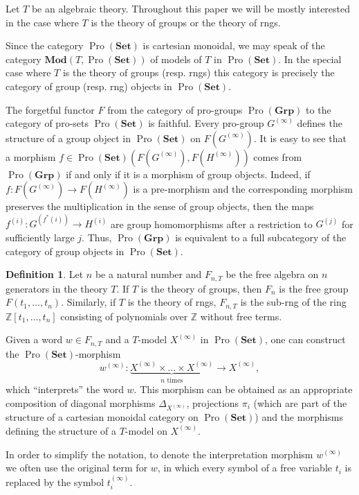 \documentclass[oneside, 11pt]{amsart}
\numberwithin{equation}{section}
\theoremstyle{definition}
\newtheorem{df}[lemma]{Definition} \Crefname{df}{Definition}{Definitions}
\theoremstyle{remark}
\DeclareMathOperator{\Pro}{Pro}
\newcommand{\Set}{\mathbf{Set}}
\newcommand{\Group}{\mathbf{Grp}}
\newcommand{\Mod}{\mathbf{Mod}}
\begin{document}
Let $T$ be an algebraic theory. Throughout this paper we will be mostly interested in the case where $T$ is the theory of groups or the theory of rngs.

Since the category $\Pro(\Set)$ is cartesian monoidal, we may speak of the category $\Mod(T, \Pro(\Set))$ of models of $T$ in \(\Pro(\Set)\).
In the special case where $T$ is the theory of groups (resp. rngs) this category is precisely the category of group (resp. rng) objects in $\Pro(\Set)$.

The forgetful functor $F$ from the category of pro-groups \(\Pro(\Group)\) to the category of pro-sets \(\Pro(\Set)\) is faithful. Every pro-group $G^{(\infty)}$ defines the structure of a group object in \(\Pro(\Set)\) on $F\left(G^{(\infty)}\right)$. It is easy to see that a morphism \(f \in \Pro(\Set)\left(F\left(G^{(\infty)}\right), F\left(H^{(\infty)}\right)\right)\) comes from \(\Pro(\Group)\) if and only if it is a morphism of group objects. Indeed, if \(f \colon F(G^{(\infty)}) \to F(H^{(\infty)})\) is a pre-morphism and the corresponding morphism preserves the multiplication in the sense of group objects, then the maps \(f^{(i)} \colon G^{(f^*(i))} \to H^{(i)}\) are group homomorphisms after a restriction to \(G^{(j)}\) for sufficiently large \(j\). Thus, $\Pro(\Group)$ is equivalent to a full subcategory of the category of group objects in $\Pro(\Set)$.

\begin{df} \label{df-pro-set-morphisms} 
 Let $n$ be a natural number and $F_{n, T}$ be the free algebra on $n$ generators in the theory $T$.
 If $T$ is the theory of groups, then $F_n$ is the free group $F(t_1,\ldots, t_n)$.
 Similarly, if $T$ is the theory of rngs, $F_{n, T}$ is the sub-rng of the ring $\mathbb{Z}[t_1,\ldots, t_n]$ consisting of polynomials over $\mathbb{Z}$ without free terms.
 
 Given a word $w \in F_{n, T}$ and a $T$-model $X^{(\infty)}$ in $\Pro(\Set)$, one can construct the $\Pro(\Set)$-morphism
 \[ w^{(\infty)} \colon \underbrace{X^{(\infty)} \times \ldots \times X^{(\infty)}}_{n\text{ times}} \to X^{(\infty)}, \]
 which ``interprets'' the word $w$. This morphism can be obtained as an appropriate composition of diagonal morphisms $\Delta_{X^{(\infty)}}$, projections $\pi_i$ 
 (which are part of the structure of a cartesian monoidal category on $\Pro(\Set)$) 
 and the morphisms defining the structure of a $T$-model on $X^{(\infty)}$.
 
 In order to simplify the notation, to denote the interpretation morphism $w^{(\infty)}$ we often use the original term for $w$, in which every symbol of a free variable $t_i$ is replaced by the symbol $t_i^{(\infty)}$.
\end{df}
\end{document}
